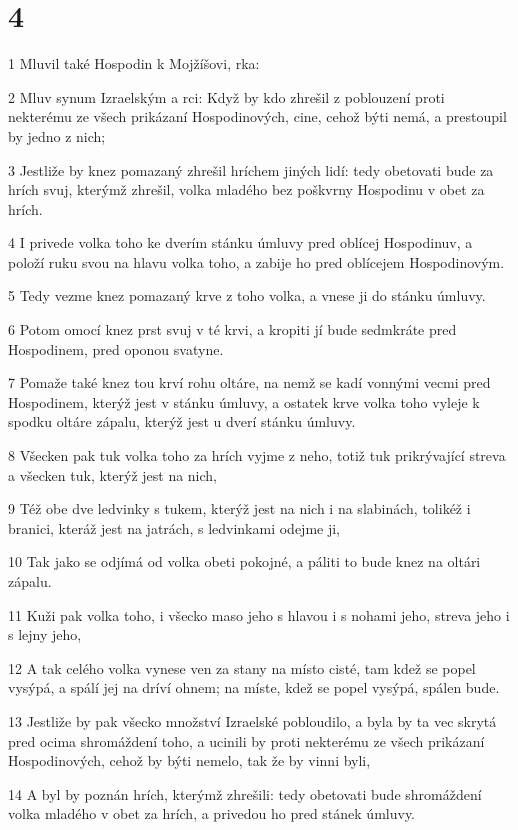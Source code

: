 \chapter{4}

\par 1 Mluvil také Hospodin k Mojžíšovi, rka:
\par 2 Mluv synum Izraelským a rci: Když by kdo zhrešil z poblouzení proti nekterému ze všech prikázaní Hospodinových, cine, cehož býti nemá, a prestoupil by jedno z nich;
\par 3 Jestliže by knez pomazaný zhrešil hríchem jiných lidí: tedy obetovati bude za hrích svuj, kterýmž zhrešil, volka mladého bez poškvrny Hospodinu v obet za hrích.
\par 4 I privede volka toho ke dverím stánku úmluvy pred oblícej Hospodinuv, a položí ruku svou na hlavu volka toho, a zabije ho pred oblícejem Hospodinovým.
\par 5 Tedy vezme knez pomazaný krve z toho volka, a vnese ji do stánku úmluvy.
\par 6 Potom omocí knez prst svuj v té krvi, a kropiti jí bude sedmkráte pred Hospodinem, pred oponou svatyne.
\par 7 Pomaže také knez tou krví rohu oltáre, na nemž se kadí vonnými vecmi pred Hospodinem, kterýž jest v stánku úmluvy, a ostatek krve volka toho vyleje k spodku oltáre zápalu, kterýž jest u dverí stánku úmluvy.
\par 8 Všecken pak tuk volka toho za hrích vyjme z neho, totiž tuk prikrývající streva a všecken tuk, kterýž jest na nich,
\par 9 Též obe dve ledvinky s tukem, kterýž jest na nich i na slabinách, tolikéž i branici, kteráž jest na jatrách, s ledvinkami odejme ji,
\par 10 Tak jako se odjímá od volka obeti pokojné, a páliti to bude knez na oltári zápalu.
\par 11 Kuži pak volka toho, i všecko maso jeho s hlavou i s nohami jeho, streva jeho i s lejny jeho,
\par 12 A tak celého volka vynese ven za stany na místo cisté, tam kdež se popel vysýpá, a spálí jej na dríví ohnem; na míste, kdež se popel vysýpá, spálen bude.
\par 13 Jestliže by pak všecko množství Izraelské pobloudilo, a byla by ta vec skrytá pred ocima shromáždení toho, a ucinili by proti nekterému ze všech prikázaní Hospodinových, cehož by býti nemelo, tak že by vinni byli,
\par 14 A byl by poznán hrích, kterýmž zhrešili: tedy obetovati bude shromáždení volka mladého v obet za hrích, a privedou ho pred stánek úmluvy.
